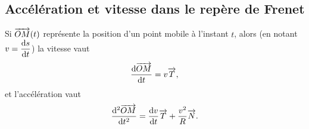 \subsection{Accélération et vitesse dans le repère de Frenet}

Si $\overrightarrow{OM}(t)$ représente la position d'un point mobile à l'instant $t$, alors (en notant$v=\dfrac{\mathrm{d} s}{\mathrm{d} t}$) la vitesse vaut
\begin{equation}
  \dfrac{\mathrm{d} \overrightarrow{OM}}{\mathrm{d} t} = v \overrightarrow{T},
\end{equation}
et l'accélération vaut
\begin{equation}
  \dfrac{\mathrm{d}^2 \overrightarrow{OM}}{\mathrm{d} {t}^2} = \dfrac{\mathrm{d} v}{\mathrm{d} t} \overrightarrow{T} + \frac{v^2}{R} \overrightarrow{N}.
\end{equation}
